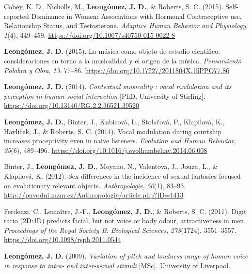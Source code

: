 \documentclass[11pt, a4paper]{awesome-cv}
\begin{document}
\leavevmode{}%
Cobey, K. D., Nicholls, M., \textbf{Leongómez, J. D.}, \& Roberts, S. C.
(2015). {Self-reported Dominance in Women: Associations with Hormonal
Contraceptive use, Relationship Status, and Testosterone}.
\emph{Adaptive Human Behavior and Physiology}, \emph{1}(4), 449--459.
\url{https://doi.org/10.1007/s40750-015-0022-8}

\leavevmode{}%
\textbf{Leongómez, J. D.} (2015). {La m{ú}sica como objeto de estudio
cient{í}fico: consideraciones en torno a la musicalidad y el origen de
la m{ú}sica}. \emph{Pensamiento Palabra y Obra}, \emph{13}, 77--86.
\url{https://doi.org/10.17227/2011804X.15PPO77.86}

\leavevmode{}%
\textbf{Leongómez, J. D.} (2014). \emph{{Contextual musicality : vocal
modulation and its perception in human social interaction}} {[}PhD,
University of Stirling{]}.
\url{https://doi.org/10.13140/RG.2.2.36521.39520}

\leavevmode{}%
\textbf{Leongómez, J. D.}, Binter, J., Kubicová, L., Stolařová, P.,
Klapilová, K., Havlíček, J., \& Roberts, S. C. (2014). {Vocal modulation
during courtship increases proceptivity even in naive listeners}.
\emph{Evolution and Human Behavior}, \emph{35}(6), 489--496.
\url{https://doi.org/10.1016/j.evolhumbehav.2014.06.008}

\leavevmode{}%
Binter, J., \textbf{Leongómez, J. D.}, Moyano, N., Valentova, J., Jouza,
L., \& Klapilová, K. (2012). {Sex differences in the incidence of sexual
fantasies focused on evolutionary relevant objects.}
\emph{Anthropologie}, \emph{50}(1), 83--93.
\url{http://puvodni.mzm.cz/Anthropologie/article.php?ID=1413}

\leavevmode{}%
Ferdenzi, C., Lemaître, J.-F., \textbf{Leongómez, J. D.}, \& Roberts, S.
C. (2011). {Digit ratio (2D:4D) predicts facial, but not voice or body
odour, attractiveness in men.} \emph{Proceedings of the Royal Society B:
Biological Sciences}, \emph{278}(1724), 3551--3557.
\url{https://doi.org/10.1098/rspb.2011.0544}

\leavevmode{}%
\textbf{Leongómez, J. D.} (2009). \emph{{Variation of pitch and loudness
range of human voice in response to intra- and inter-sexual stimuli}}
{[}MSc{]}. University of Liverpool.
\end{document}
